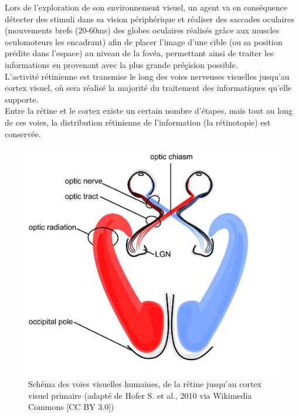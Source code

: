 Lors de l'exploration de son environnement visuel, un agent va en conséquence détecter des stimuli dans sa vision périphérique et réaliser des saccades oculaires (mouvements brefs (20-60\si{\milli\second}) des globes oculaires réalisés grâce aux muscles oculomoteurs les encadrant) afin de placer l'image d'une cible (ou sa position prédite dans l'espace) au niveau de la fovéa, permettant ainsi de traiter les informations en provenant avec la plus grande préçision possible.\\

L'activité rétinienne est transmise le long des voies nerveuses visuelles jusqu'au cortex visuel, où sera réalisé la majorité du traitement des informatiques qu'elle supporte. \\
Entre la rétine et le cortex existe un certain nombre d'étapes, mais tout au long de ces voies, la distribution rétinienne de l'information  (la rétinotopie) est conservée. 

\begin{figure}[th]
\centering
\includegraphics{Figures/visual_system}
\decoRule %
\caption[Figure]{Schéma des voies visuelles humaines, de la rétine jusqu'au cortex visuel primaire (adapté de Hofer S. et al., 2010 via Wikimedia Commons [CC BY 3.0])}
\label{fig:visual_system}
\end{figure}

